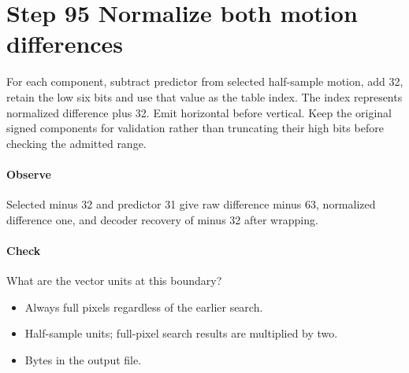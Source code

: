 \section{Step 95 Normalize both motion differences}\label{h263-syntax-s05}
For each component, subtract predictor from selected half-sample motion, add
32, retain the low six bits and use that value as the table index. The index
represents normalized difference plus 32. Emit horizontal before vertical.
Keep the original signed components for validation rather than truncating their
high bits before checking the admitted range.

\paragraph{Observe} Selected minus 32 and predictor 31 give raw difference minus
63, normalized difference one, and decoder recovery of minus 32 after wrapping.
\paragraph{Check} What are the vector units at this boundary?
\begin{itemize}
  \item[A.] Always full pixels regardless of the earlier search.
  \item[B.] Half-sample units; full-pixel search results are multiplied by two.
  \item[C.] Bytes in the output file.
\end{itemize}
